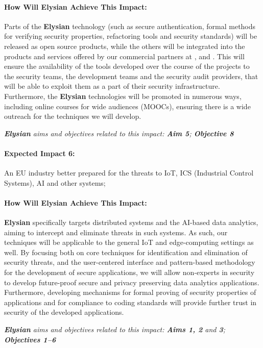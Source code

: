 \documentclass[a4paper,11pt]{article}
\newcommand{\project}[1]{\textbf{#1}\xspace}
\newcommand{\SECURITY}{\project{Elysian}}
\newcommand{\TheProject}{\SECURITY}
\begin{document}
\begin{mdframed}[backgroundcolor=gray!10]
\paragraph{How Will \TheProject{} Achieve This Impact:}
Parts of the \TheProject{} technology (such as secure authentication, formal methods for verifying security properties, refactoring tools and security standards) will be released as open source products, while the others will be integrated into the products and services offered by our commercial partners at \IBMshort{}, \YAGshort{} and \SOPRAshort{}. This will ensure the availability of the tools developed over the course of the projects to the security teams, the development teams and the security audit providers, that will be able to exploit them as a part of their security infrastructure. Furthermore, the \TheProject{} technologies will be promoted in numerous ways, including online courses for wide audiences (MOOCs), ensuring there is a wide outreach for the techniques we will develop.

\emph{\TheProject{} aims and objectives related to this impact: \textbf{Aim 5}; \textbf{Objective 8} }

\end{mdframed}

\begin{mdframed}[backgroundcolor=blue!5]
\paragraph{Expected Impact 6:}
An EU industry better prepared for the threats to IoT, ICS (Industrial Control Systems), AI and other systems;
\end{mdframed}

\begin{mdframed}[backgroundcolor=gray!10]
\paragraph{How Will \TheProject{} Achieve This Impact:}
\TheProject{} specifically targets distributed systems and the AI-based data analytics, aiming to intercept and eliminate threats in such systems. As such, our techniques will be applicable to the general IoT and edge-computing settings as well. By focusing both on core techniques for identification and elimination of security threats, and the user-centered interface and pattern-based methodology for the development of secure applications, we will allow non-experts in security to develop future-proof secure and privacy preserving data analytics applications. Furthermore, developing mechanisms for formal proving of security properties of applications and for compliance to coding standards will provide further trust in security of the developed applications.

\emph{\TheProject{} aims and objectives related to this impact: \textbf{Aims 1, 2}  and \textbf{3}; \textbf{Objectives 1--6} }

\end{mdframed}
\end{document}
